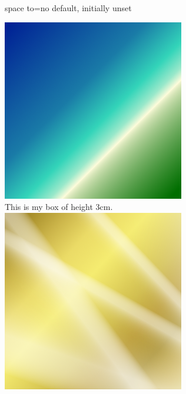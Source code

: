 \begin{docTcbKey}[][doc new=2015-02-15]{space to}{=}{no default, initially unset}
\begin{dispExample}
\begin{tcolorbox}[colframe=blue!75!black,colback=white,height=3cm,
    space to=\myspace]
  \includegraphics[width=\linewidth,
    height=0.33\dimexpr\myspace]{blueshade.png}\\[1mm]
  This is my box of height 3cm.\\[2mm]
  \includegraphics[width=\linewidth,
    height=0.67\dimexpr\myspace]{goldshade.png}
\end{tcolorbox}
\end{dispExample}
\end{docTcbKey}




